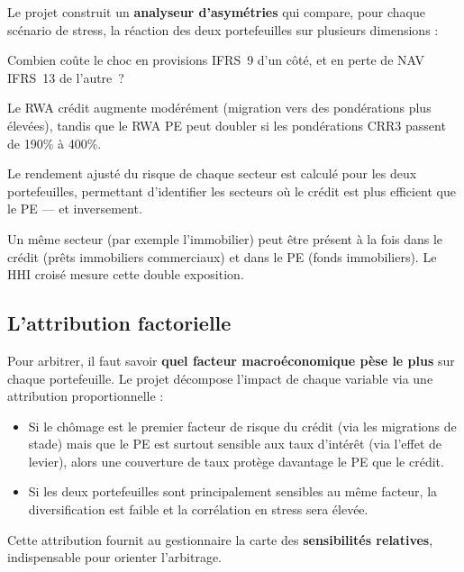 \documentclass[12pt,a4paper]{article}
\begin{document}
Le projet construit un \textbf{analyseur d'asymétries} qui compare, pour chaque scénario de stress, la réaction des deux portefeuilles sur plusieurs dimensions :

\begin{description}[style=nextline, leftmargin=1.5cm]
  \item[Provisionnement vs. juste valeur] Combien coûte le choc en provisions IFRS~9 d'un côté, et en perte de NAV IFRS~13 de l'autre~?
  \item[Consommation de capital] Le RWA crédit augmente modérément (migration vers des pondérations plus élevées), tandis que le RWA PE peut doubler si les pondérations CRR3 passent de 190\% à 400\%.
  \item[RAROC sectoriel] Le rendement ajusté du risque de chaque secteur est calculé pour les deux portefeuilles, permettant d'identifier les secteurs où le crédit est plus efficient que le PE --- et inversement.
  \item[Concentration croisée] Un même secteur (par exemple l'immobilier) peut être présent à la fois dans le crédit (prêts immobiliers commerciaux) et dans le PE (fonds immobiliers). Le HHI croisé mesure cette double exposition.
\end{description}

\subsection{L'attribution factorielle}

Pour arbitrer, il faut savoir \textbf{quel facteur macroéconomique pèse le plus} sur chaque portefeuille. Le projet décompose l'impact de chaque variable via une attribution proportionnelle :

\begin{itemize}
  \item Si le chômage est le premier facteur de risque du crédit (via les migrations de stade) mais que le PE est surtout sensible aux taux d'intérêt (via l'effet de levier), alors une couverture de taux protège davantage le PE que le crédit.
  \item Si les deux portefeuilles sont principalement sensibles au même facteur, la diversification est faible et la corrélation en stress sera élevée.
\end{itemize}

Cette attribution fournit au gestionnaire la carte des \textbf{sensibilités relatives}, indispensable pour orienter l'arbitrage.
\end{document}
